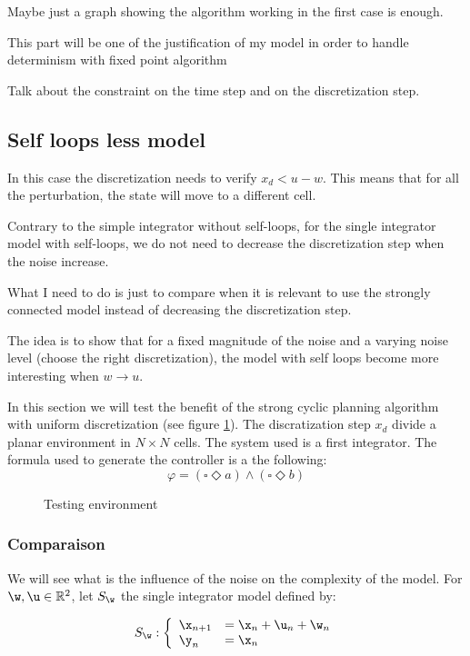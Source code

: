 Maybe just a graph showing the algorithm working in the first case is enough. 

This part will be one of the justification of my model in order to handle determinism with fixed point algorithm

Talk about the constraint on the time step and on the discretization step.

\subsection{Self loops less model}

In this case the discretization needs to verify $x_d<u-w$.
This means that for all the perturbation, the state will move to a different cell.

Contrary to the simple integrator without self-loops, for the single integrator model with self-loops, we do not need to decrease the discretization step when the noise increase.

What I need to do is just to compare when it is relevant to use the strongly connected model instead of decreasing the discretization step.

The idea is to show that for a fixed magnitude of the noise and a varying noise level (choose the right discretization), the model with self loops become more interesting when $w \rightarrow u$.


In this section we will test the benefit of the strong cyclic planning algorithm with uniform discretization (see figure \ref{fig:environment}).
The discratization step $x_d$ divide a planar environment in $N \times N$ cells. The system used is a first integrator.
The formula used to generate the controller is a the following:
$$\varphi = (\square \Diamond a) \wedge (\square \Diamond b)$$

\begin{figure}
	
	\caption{Testing environment}
	\label{fig:environment}
\end{figure}

\subsubsection{Comparaison}
We will see what is the influence of the noise on the complexity of the model.
For $\w,\u \in \mathbb{R}^2$, let $S_\w$ the single integrator model defined by:

\begin{equation}\label{eqn:sing_int}
S_\w:
\left \{
\begin{array}{ll}
\x_{n+1} &= \x_n + \u_n + \w_n\\
\y_n &= \x_n
\end{array}
\right.
\end{equation}

